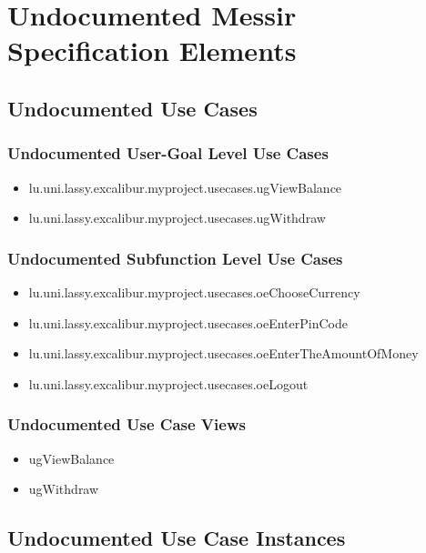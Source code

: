 	
\chapter{Undocumented Messir Specification Elements}


\section[Undocumented Use Cases]{Undocumented Use Cases}


\subsection[Undocumented Use Cases - User-Goal Level]{Undocumented User-Goal Level Use Cases}
\begin{itemize}
\item lu.uni.lassy.excalibur.myproject.usecases.ugViewBalance 
\item lu.uni.lassy.excalibur.myproject.usecases.ugWithdraw 
\end{itemize}

\subsection[Undocumented Use Cases - Subfunction Level]{Undocumented Subfunction Level Use Cases}
\begin{itemize}
\item lu.uni.lassy.excalibur.myproject.usecases.oeChooseCurrency 
\item lu.uni.lassy.excalibur.myproject.usecases.oeEnterPinCode 
\item lu.uni.lassy.excalibur.myproject.usecases.oeEnterTheAmountOfMoney 
\item lu.uni.lassy.excalibur.myproject.usecases.oeLogout 
\end{itemize}

\subsection[Undocumented Use Case Views]{Undocumented Use Case Views}
\begin{itemize}
\item ugViewBalance 
\item ugWithdraw 
\end{itemize}




\section[Undocumented Use Case Instances]{Undocumented Use Case Instances}


